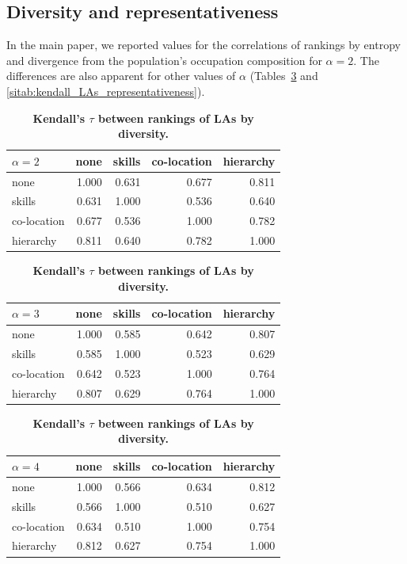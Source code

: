 \documentclass[aps,pre,floats,floatfix,superscriptaddress,twocolumn,final,10pt]{revtex4-2}
\theoremstyle{definition}
\begin{document}
\subsection{Diversity and representativeness}
In the main paper, we reported values for the correlations of rankings by entropy and divergence from the population's occupation composition for $\alpha=2$. The differences are also apparent for other values of $\alpha$ (Tables~\ref{sitab:kendall_LAs_diversity} and \ref{sitab:kendall_LAs_representativeness}).
\begin{table}[]
    \centering
    \begin{tabular}{lrrrr}
    \toprule
     $\alpha=2$ & none & skills & co-location & hierarchy \\
    \midrule
    none & 1.000 & 0.631 & 0.677 & 0.811 \\
    skills & 0.631 & 1.000 & 0.536 & 0.640 \\
    co-location & 0.677 & 0.536 & 1.000 & 0.782 \\
    hierarchy & 0.811 & 0.640 & 0.782 & 1.000 \\
    \bottomrule
    \end{tabular}

    \begin{tabular}{lrrrr}
    \toprule
     $\alpha=3$ & none & skills & co-location & hierarchy \\
    \midrule
    none & 1.000 & 0.585 & 0.642 & 0.807 \\
    skills & 0.585 & 1.000 & 0.523 & 0.629 \\
    co-location & 0.642 & 0.523 & 1.000 & 0.764 \\
    hierarchy & 0.807 & 0.629 & 0.764 & 1.000 \\
    \bottomrule
    \end{tabular}

    \begin{tabular}{lrrrr}
    \toprule
     $\alpha=4$ & none & skills & co-location & hierarchy \\
    \midrule
    none & 1.000 & 0.566 & 0.634 & 0.812 \\
    skills & 0.566 & 1.000 & 0.510 & 0.627 \\
    co-location & 0.634 & 0.510 & 1.000 & 0.754 \\
    hierarchy & 0.812 & 0.627 & 0.754 & 1.000 \\
    \bottomrule
    \end{tabular}
    \caption{\textbf{Kendall's $\tau$ between rankings of LAs by diversity.}}
    \label{sitab:kendall_LAs_diversity}
\end{table}
\end{document}
